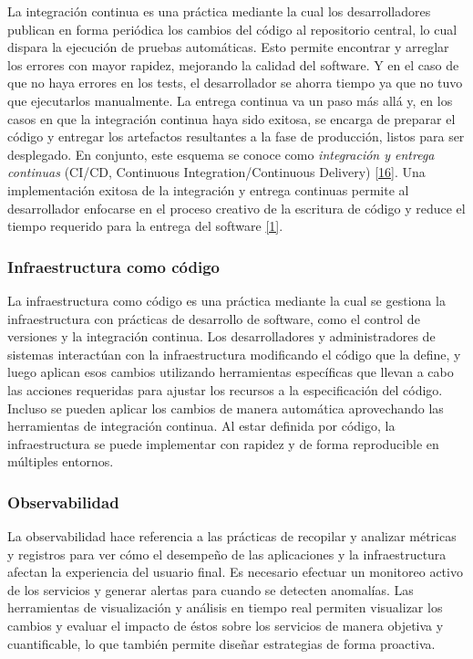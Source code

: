 La integración continua es una práctica mediante la cual los desarrolladores publican en forma periódica los cambios del código al repositorio central, lo cual dispara la ejecución de pruebas automáticas. Esto permite encontrar y arreglar los errores con mayor rapidez, mejorando la calidad del software. Y en el caso de que no haya errores en los tests, el desarrollador se ahorra tiempo ya que no tuvo que ejecutarlos manualmente. La entrega continua va un paso más allá y, en los casos en que la integración continua haya sido exitosa, se encarga de preparar el código y entregar los artefactos resultantes a la fase de producción, listos para ser desplegado. En conjunto, este esquema se conoce como \textit{integración y entrega continuas} (CI/CD, Continuous Integration/Continuous Delivery) \href{https://www.zotero.org/google-docs/?B8ocYp}{[16]}. Una implementación exitosa de la integración y entrega continuas permite al desarrollador enfocarse en el proceso creativo de la escritura de código y reduce el tiempo requerido para la entrega del software \href{https://www.zotero.org/google-docs/?TVFgip}{[1]}.

\subsubsection{Infraestructura como código}

La infraestructura como código es una práctica mediante la cual se gestiona la infraestructura con prácticas de desarrollo de software, como el control de versiones y la integración continua. Los desarrolladores y administradores de sistemas interactúan con la infraestructura modificando el código que la define, y luego aplican esos cambios utilizando herramientas específicas que llevan a cabo las acciones requeridas para ajustar los recursos a la especificación del código. Incluso se pueden aplicar los cambios de manera automática aprovechando las herramientas de integración continua. Al estar definida por código, la infraestructura se puede implementar con rapidez y de forma reproducible en múltiples entornos. 

\subsubsection{Observabilidad}

La observabilidad hace referencia a las prácticas de recopilar y analizar métricas y registros para ver cómo el desempeño de las aplicaciones y la infraestructura afectan la experiencia del usuario final. Es necesario efectuar un monitoreo activo de los servicios y generar alertas para cuando se detecten anomalías. Las herramientas de visualización y análisis en tiempo real permiten visualizar los cambios y evaluar el impacto de éstos sobre los servicios de manera objetiva y cuantificable, lo que también permite diseñar estrategias de forma proactiva.

